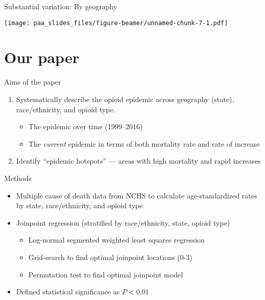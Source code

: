 \documentclass[ignorenonframetext,compress]{beamer}
\providecommand{\tightlist}{%
  \setlength{\itemsep}{0pt}\setlength{\parskip}{0pt}}
\begin{document}
\begin{frame}{Substantial variation: By geography}

\texttt{[image: paa\_slides\_files/figure-beamer/unnamed-chunk-7-1.pdf]}

\end{frame}

\section{Our paper}\label{our-paper}

\begin{frame}{Aims of the paper}

\begin{enumerate}[<+->]
\def\labelenumi{\arabic{enumi}.}
\tightlist
\item
  Systematically describe the opioid epidemic across geography (state),
  race/ethnicity, and opioid type.

  \begin{itemize}[<+->]
  \tightlist
  \item
    The epidemic over time (1999--2016)
  \item
    The \emph{current} epidemic in terms of both mortality rate and rate
    of increase
  \end{itemize}
\item
  Identify ``epidemic hotspots'' --- areas with high mortality and rapid
  increases
\end{enumerate}

\end{frame}

\begin{frame}{Methods}

\begin{itemize}[<+->]
\tightlist
\item
  Multiple cause of death data from NCHS to calculate age-standardized
  rates by state, race/ethnicity, and opioid type
\item
  Joinpoint regression (stratified by race/ethnicity, state, opioid
  type)

  \begin{itemize}[<+->]
  \tightlist
  \item
    Log-normal segmented weighted least squares regression
  \item
    Grid-search to find optimal joinpoint locations (0-3)
  \item
    Permutation test to find optimal joinpoint model
  \end{itemize}
\item
  Defined statistical significance as \(P < 0.01\)
\end{itemize}

\end{frame}
\end{document}
